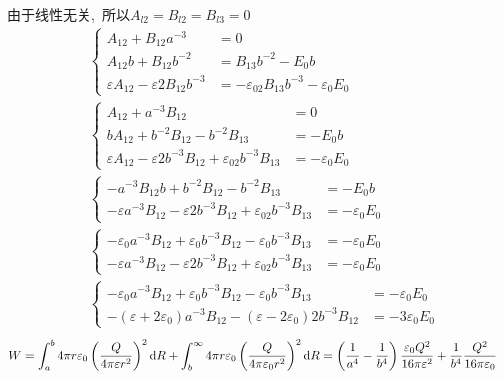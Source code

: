 由于线性无关, \,所以$A_{l2}=B_{l2}=B_{l3}=0$
\begin{align*}&\left\{
\begin{aligned}
        A_{12}+B_{12}a^{-3}&=0\\
A_{12}b
+B_{12}b^{-2}&=
B_{13}b^{-2}-E_0b\\
\varepsilon A_{12}
-\varepsilon 2B_{12} b^{-3}&=-\varepsilon_02
B_{13} b^{-3}-\varepsilon_0E_0
\end{aligned}
\right.\\
&\left\{
\begin{aligned}
A_{12}+a^{-3}B_{12}&=0\\
bA_{12}
+b^{-2}B_{12}
-b^{-2}B_{13}&=
-E_0b\\
\varepsilon A_{12}
-\varepsilon 2b^{-3}B_{12} 
+\varepsilon_02b^{-3}
B_{13} &=-\varepsilon_0E_0
\end{aligned}
\right.\\
&\left\{
\begin{aligned}
-a^{-3}B_{12}b
+b^{-2}B_{12}
-b^{-2}B_{13}&=
-E_0b\\
-\varepsilon a^{-3}B_{12}
-\varepsilon 2b^{-3}B_{12} 
+\varepsilon_02b^{-3}
B_{13} &=-\varepsilon_0E_0
\end{aligned}
\right.
\\
&\left\{
\begin{aligned}
-\varepsilon_0a^{-3}B_{12}
+\varepsilon_0b^{-3}B_{12}
-\varepsilon_0b^{-3}B_{13}&=
-\varepsilon_0E_0\\
-\varepsilon a^{-3}B_{12}
-\varepsilon 2b^{-3}B_{12} 
+\varepsilon_02b^{-3}
B_{13} &=-\varepsilon_0E_0
\end{aligned}
\right.\\
&\left\{
\begin{aligned}
-\varepsilon_0a^{-3}B_{12}
+\varepsilon_0b^{-3}B_{12}
-\varepsilon_0b^{-3}B_{13}&=
-\varepsilon_0E_0\\
-(\varepsilon+2\varepsilon_0) a^{-3}B_{12}
-(\varepsilon-2\varepsilon_0) 2b^{-3}B_{12} 
 &=-3\varepsilon_0E_0
\end{aligned}
\right.
\end{align*}
\begin{align*}
    W&=\int_{a}^{b}4\pi r\varepsilon_0\left(\frac{Q}{4\pi\varepsilon r^2}\right)^2\dif R
+\int_{b}^{\infty}4\pi r\varepsilon_0\left(\frac{Q}{4\pi\varepsilon_0r^2}\right)^2\dif R=\left(\frac{1}{a^4}-\frac{1}{b^4}\right)\frac{\varepsilon_0Q^2}{16\pi\varepsilon^2}+\frac{1}{b^4}\frac{Q^2}{16\pi\varepsilon_0}
\end{align*}
